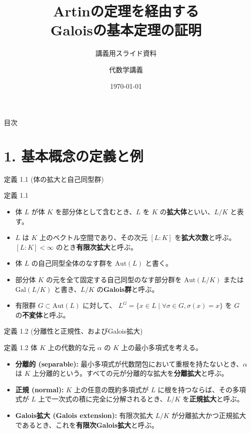 \documentclass[aspectratio=169,11pt,unicode]{beamer}
\title[Galoisの基本定理]{Artinの定理を経由する\\Galoisの基本定理の証明}
\subtitle{講義用スライド資料}
\author{代数学講義}
\date{\today}
\begin{document}
\frame{\titlepage}

\begin{frame}{目次}
    \tableofcontents
\end{frame}

\section{1. 基本概念の定義と例}

\begin{frame}{定義 1.1 (体の拡大と自己同型群)}
\begin{block}{定義 1.1}
\begin{itemize}
    \item 体 $L$ が体 $K$ を部分体として含むとき、$L$ を $K$ の\textbf{拡大体}といい、$L/K$ と表す。
    \item $L$ は $K$ 上のベクトル空間であり、その次元 $[L:K]$ を\textbf{拡大次数}と呼ぶ。$[L:K] < \infty$ のとき\textbf{有限次拡大}と呼ぶ。
    \item 体 $L$ の自己同型全体のなす群を $\mathrm{Aut}(L)$ と書く。
    \item 部分体 $K$ の元を全て固定する自己同型のなす部分群を $\mathrm{Aut}(L/K)$ または $\mathrm{Gal}(L/K)$ と書き、$L/K$ の\textbf{Galois群}と呼ぶ。
    \item 有限群 $G \subset \mathrm{Aut}(L)$ に対して、 $L^G = \{x \in L \mid \forall \sigma \in G, \sigma(x) = x\}$ を $G$ の\textbf{不変体}と呼ぶ。
\end{itemize}
\end{block}
\end{frame}

\begin{frame}{定義 1.2 (分離性と正規性、およびGalois拡大)}
\begin{block}{定義 1.2}
体 $K$ 上の代数的な元 $\alpha$ の $K$ 上の最小多項式を考える。
\begin{itemize}
    \item \textbf{分離的 (separable):} 最小多項式が代数閉包において重根を持たないとき、$\alpha$ は $K$ 上分離的という。すべての元が分離的な拡大を\textbf{分離拡大}と呼ぶ。
    \item \textbf{正規 (normal):} $K$ 上の任意の既約多項式が $L$ に根を持つならば、その多項式が $L$ 上で一次式の積に完全に分解されるとき、$L/K$ を\textbf{正規拡大}と呼ぶ。
    \item \textbf{Galois拡大 (Galois extension):} 有限次拡大 $L/K$ が分離拡大かつ正規拡大であるとき、これを\textbf{有限次Galois拡大}と呼ぶ。
\end{itemize}
\end{block}
\end{frame}
\end{document}
